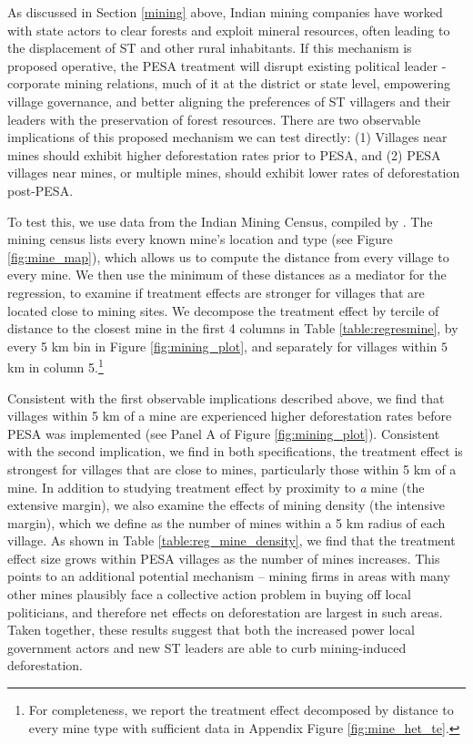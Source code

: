 \documentclass[12pt,reqno]{article}
\begin{document}
As discussed in Section \ref{mining} above, Indian mining companies have worked with state actors to clear forests and exploit mineral resources, often leading to the displacement of ST and other rural inhabitants. If this mechanism is proposed operative, the PESA treatment will disrupt existing political leader - corporate mining relations, much of it at the district or state level, empowering village governance, and better aligning the preferences of ST villagers and their leaders with the preservation of forest resources. There are two observable implications of this proposed mechanism we can test directly: (1) Villages near mines should exhibit higher deforestation rates prior to PESA, and (2) PESA villages near mines, or multiple mines, should exhibit lower rates of deforestation post-PESA.


To test this, we use data from the Indian Mining Census, compiled by \textcite{asher2019rent}. The mining census lists every known mine's location and type (see Figure \ref{fig:mine_map}), which allows us to compute the distance from every village to every mine. We then use the minimum of these distances as a mediator for the regression, to examine if treatment effects are stronger for villages that are located close to mining sites. We decompose the treatment effect by tercile of distance to the closest mine in the first 4 columns in Table \ref{table:regresmine}, by every 5 km bin in Figure \ref{fig:mining_plot}, and separately for villages within $5$ km in column 5.\footnote{For completeness, we report the treatment effect decomposed by distance to every mine type with sufficient data in Appendix Figure \ref{fig:mine_het_te}.}

Consistent with the first observable implications described above, we find that villages within 5 km of a mine are experienced higher deforestation rates before PESA was implemented (see Panel A of Figure \ref{fig:mining_plot}). Consistent with the second implication, we find in both specifications, the treatment effect is strongest for villages that are close to mines, particularly those within 5 km of a mine. In addition to studying treatment effect by proximity to \emph{a} mine (the extensive margin), we also examine the effects of mining density (the intensive margin), which we define as the number of mines within a 5 km radius of each village. As shown in Table \ref{table:reg_mine_density}, we find that the treatment effect size grows within PESA villages as the number of mines increases. This points to an additional potential mechanism -- mining firms in areas with many other mines plausibly face a collective action problem in buying off local politicians, and therefore net effects on deforestation are largest in such areas. Taken together, these results suggest that both the increased power local government actors and new ST leaders are able to curb mining-induced deforestation. 
\end{document}
